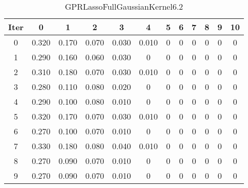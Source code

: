 \begin{table}
	\begin{center}
		\begin{tabular}{|c|c|c|c|c|c|c|c|c|c|c|c|}
			\hline
			Iter & 0 & 1 & 2 & 3 & 4 & 5 & 6 & 7 & 8 & 9 & 10 \\
			\hline
			0 & 0.320 & 0.170 & 0.070 & 0.030 & 0.010 & 0 & 0 & 0 & 0 & 0 & 0 \\
			\hline
			1 & 0.290 & 0.160 & 0.060 & 0.030 & 0 & 0 & 0 & 0 & 0 & 0 & 0 \\
			\hline
			2 & 0.310 & 0.180 & 0.070 & 0.030 & 0.010 & 0 & 0 & 0 & 0 & 0 & 0 \\
			\hline
			3 & 0.280 & 0.110 & 0.080 & 0.020 & 0 & 0 & 0 & 0 & 0 & 0 & 0 \\
			\hline
			4 & 0.290 & 0.100 & 0.080 & 0.010 & 0 & 0 & 0 & 0 & 0 & 0 & 0 \\
			\hline
			5 & 0.320 & 0.170 & 0.070 & 0.030 & 0.010 & 0 & 0 & 0 & 0 & 0 & 0 \\
			\hline
			6 & 0.270 & 0.100 & 0.070 & 0.010 & 0 & 0 & 0 & 0 & 0 & 0 & 0 \\
			\hline
			7 & 0.330 & 0.180 & 0.080 & 0.040 & 0.010 & 0 & 0 & 0 & 0 & 0 & 0 \\
			\hline
			8 & 0.270 & 0.090 & 0.070 & 0.010 & 0 & 0 & 0 & 0 & 0 & 0 & 0 \\
			\hline
			9 & 0.270 & 0.090 & 0.070 & 0.010 & 0 & 0 & 0 & 0 & 0 & 0 & 0 \\
			\hline
		\end{tabular}
	\end{center}
	\caption{GPRLassoFullGaussianKernel6.2}
\end{table}